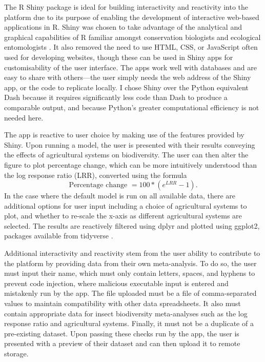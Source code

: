 \documentclass[11pt]{article}
\begin{document}
		\noindent The R Shiny package \citep{chang2022shiny} is ideal for building interactivity and reactivity into the platform due to its purpose of enabling the development of interactive web-based applications in R. Shiny was chosen to take advantage of the analytical and graphical capabilities of R familiar amongst conservation biologists and ecological entomologists \citep{lai2019evaluating}. It also removed the need to use HTML, CSS, or JavaScript often used for developing websites, though these can be used in Shiny apps for customisability of the user interface. The apps work well with databases and are easy to share with others—the user simply needs the web address of the Shiny app, or the code to replicate locally. I chose Shiny over the Python equivalent Dash \citep{hossain2019visualization} because it requires significantly less code than Dash to produce a comparable output, and because Python’s greater computational efficiency is not needed here. 
		
		\noindent The app is reactive to user choice by making use of the features provided by Shiny. Upon running a model, the user is presented with their results conveying the effects of agricultural systems on biodiversity. The user can then alter the figure to plot percentage change, which can be more intuitively understood than the log response ratio (LRR), converted using the formula
		\begin{equation}
		\mbox{Percentage change } = 100 * (e^{LRR} - 1). %
		\end{equation}
		\noindent In the case where the default model is run on all available data, there are additional options for user input including a choice of agricultural systems to plot, and whether to re-scale the x-axis as different agricultural systems are selected. The results are reactively filtered using dplyr and plotted using ggplot2, packages available from tidyverse \citep{wickham2019welcome}. 
		
		\noindent Additional interactivity and reactivity stem from the user ability to contribute to the platform by providing data from their own meta-analysis. To do so, the user must input their name, which must only contain letters, spaces, and hyphens to prevent code injection, where malicious executable input is entered and mistakenly run by the app. The file uploaded must be a file of comma-separated values to maintain compatibility with other data spreadsheets. It also must contain appropriate data for insect biodiversity meta-analyses such as the log response ratio and agricultural systems. Finally, it must not be a duplicate of a pre-existing dataset. Upon passing these checks run by the app, the user is presented with a preview of their dataset and can then upload it to remote storage. 
		
\end{document}
